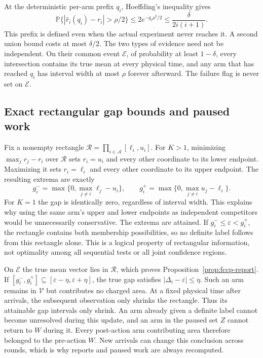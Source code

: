 \documentclass[11pt]{article}
\theoremstyle{remark}
\newcommand{\Prob}{\mathbb P}
\begin{document}
At the deterministic per-arm prefix $q_i$, Hoeffding's inequality gives
\[
 \Prob\{|\hat r_i(q_i)-r_i|>\rho/2\}
 \le2e^{-q_i\rho^2/2}\le\frac{\delta}{2i(i+1)}.
\]
This prefix is defined even when the actual experiment never reaches it.
A second union bound costs at most $\delta/2$. The two types of evidence
need not be independent. On their common event $\mathcal E$, of
probability at least $1-\delta$, every intersection contains its true
mean at every physical time, and any arm that has reached $q_i$ has
interval width at most $\rho$ forever afterward. The failure flag is
never set on $\mathcal E$.

\subsection{Exact rectangular gap bounds and paused work}
Fix a nonempty rectangle
$\mathcal R=\prod_{i\in\mathcal A}[\ell_i,u_i]$.
For $K>1$, minimizing $\max_jr_j-r_i$ over $\mathcal R$ sets
$r_i=u_i$ and every other coordinate to its lower endpoint. Maximizing
it sets $r_i=\ell_i$ and every other coordinate to its upper endpoint.
The resulting extrema are exactly
\[
 g_i^-=\max\{0,\max_{j\ne i}\ell_j-u_i\},\qquad
 g_i^+=\max\{0,\max_{j\ne i}u_j-\ell_i\}.
\]
For $K=1$ the gap is identically zero, regardless of interval width.
This explains why using the same arm's upper and lower endpoints as
independent competitors would be unnecessarily conservative.
The extrema are attained. If
$g_i^-\le\varepsilon<g_i^+$, the rectangle contains both membership
possibilities, so no definite label follows from this rectangle alone.
This is a logical property of rectangular information, not optimality
among all sequential tests or all joint confidence regions.

On $\mathcal E$ the true mean vector lies in $\mathcal R$, which proves
Proposition~\ref{prop:fccp-report}. If
$[g_i^-,g_i^+]\subseteq[\varepsilon-\eta,\varepsilon+\eta]$, the true
gap satisfies $|\Delta_i-\varepsilon|\le\eta$. Such an arm remains in
$\mathcal V$ but contributes no charged area. At a fixed physical time
after arrivals, the subsequent observation only shrinks the rectangle.
Thus its attainable gap intervals only shrink. An arm already given a
definite label cannot become unresolved during this update, and an arm
in the paused set $Z$ cannot return to $W$ during it. Every post-action
arm contributing area therefore belonged to the pre-action $W$.
New arrivals can change this conclusion across rounds, which is why
reports and paused work are always recomputed.
\end{document}

